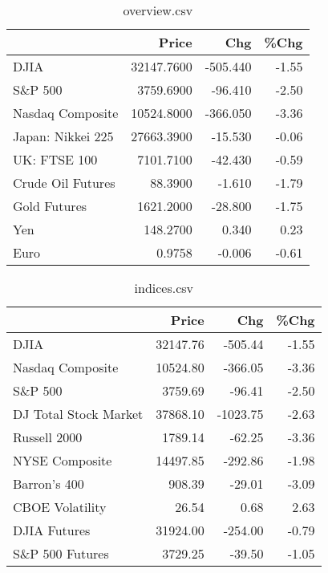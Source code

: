 \documentclass{article}%
\begin{document}
\begin{table}[htbp]%
\caption{overview.csv}%
\centering%
\begin{adjustbox}{width=1\textwidth}%
\begin{tabular}{lrrr}
\toprule
                  &      Price &      Chg &  \%Chg \\
\midrule
             DJIA & 32147.7600 & -505.440 & -1.55 \\
          S\&P 500 &  3759.6900 &  -96.410 & -2.50 \\
 Nasdaq Composite & 10524.8000 & -366.050 & -3.36 \\
Japan: Nikkei 225 & 27663.3900 &  -15.530 & -0.06 \\
     UK: FTSE 100 &  7101.7100 &  -42.430 & -0.59 \\
Crude Oil Futures &    88.3900 &   -1.610 & -1.79 \\
     Gold Futures &  1621.2000 &  -28.800 & -1.75 \\
              Yen &   148.2700 &    0.340 &  0.23 \\
             Euro &     0.9758 &   -0.006 & -0.61 \\
\bottomrule
\end{tabular}
%
\end{adjustbox}%
\end{table}

%


\begin{table}[htbp]%
\caption{indices.csv}%
\centering%
\begin{adjustbox}{width=1\textwidth}%
\begin{tabular}{lrrr}
\toprule
                      &    Price &      Chg &  \%Chg \\
\midrule
                 DJIA & 32147.76 &  -505.44 & -1.55 \\
     Nasdaq Composite & 10524.80 &  -366.05 & -3.36 \\
              S\&P 500 &  3759.69 &   -96.41 & -2.50 \\
DJ Total Stock Market & 37868.10 & -1023.75 & -2.63 \\
         Russell 2000 &  1789.14 &   -62.25 & -3.36 \\
       NYSE Composite & 14497.85 &  -292.86 & -1.98 \\
         Barron's 400 &   908.39 &   -29.01 & -3.09 \\
      CBOE Volatility &    26.54 &     0.68 &  2.63 \\
         DJIA Futures & 31924.00 &  -254.00 & -0.79 \\
      S\&P 500 Futures &  3729.25 &   -39.50 & -1.05 \\
\bottomrule
\end{tabular}
%
\end{adjustbox}%
\end{table}
\end{document}

